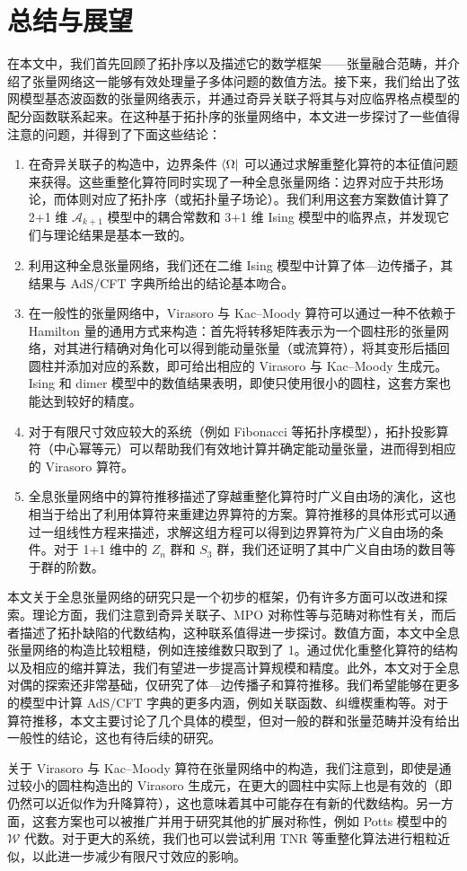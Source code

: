\chapter{总结与展望}
\label{chap:conclusion}

在本文中，我们首先回顾了拓扑序以及描述它的数学框架——张量融合范畴，并介绍了张量网络这一能够有效处理量子多体问题的数值方法。接下来，我们给出了弦网模型基态波函数的张量网络表示，并通过奇异关联子将其与对应临界格点模型的配分函数联系起来。在这种基于拓扑序的张量网络中，本文进一步探讨了一些值得注意的问题，并得到了下面这些结论：

\begin{enumerate}
  \item 在奇异关联子的构造中，边界条件 $\bra{\Omega}$ 可以通过求解重整化算符的本征值问题来获得。这些重整化算符同时实现了一种全息张量网络：边界对应于共形场论，而体则对应了拓扑序（或拓扑量子场论）。我们利用这套方案数值计算了 2+1 维 $\mathcal{A}_{k+1}$ 模型中的耦合常数和 3+1 维 Ising 模型中的临界点，并发现它们与理论结果是基本一致的。
  \item 利用这种全息张量网络，我们还在二维 Ising 模型中计算了体—边传播子，其结果与 AdS/CFT 字典所给出的结论基本吻合。
  \item 在一般性的张量网络中，Virasoro 与 Kac--Moody 算符可以通过一种不依赖于 Hamilton 量的通用方式来构造：首先将转移矩阵表示为一个圆柱形的张量网络，对其进行精确对角化可以得到能动量张量（或流算符），将其变形后插回圆柱并添加对应的系数，即可给出相应的 Virasoro 与 Kac--Moody 生成元。Ising 和 dimer 模型中的数值结果表明，即使只使用很小的圆柱，这套方案也能达到较好的精度。
  \item 对于有限尺寸效应较大的系统（例如 Fibonacci 等拓扑序模型），拓扑投影算符（中心幂等元）可以帮助我们有效地计算并确定能动量张量，进而得到相应的 Virasoro 算符。
  \item 全息张量网络中的算符推移描述了穿越重整化算符时广义自由场的演化，这也相当于给出了利用体算符来重建边界算符的方案。算符推移的具体形式可以通过一组线性方程来描述，求解这组方程可以得到边界算符为广义自由场的条件。对于 1+1 维中的 $Z_n$ 群和 $S_3$ 群，我们还证明了其中广义自由场的数目等于群的阶数。
\end{enumerate}

本文关于全息张量网络的研究只是一个初步的框架，仍有许多方面可以改进和探索。理论方面，我们注意到奇异关联子、MPO 对称性等与范畴对称性\cite{ji2020categorical,kong2020algebraic,wu2021categorical,lootens2023dualities}\allowbreak 有关，而后者描述了拓扑缺陷的代数结构，这种联系值得进一步探讨。数值方面，本文中全息张量网络的构造比较粗糙，例如连接维数只取到了 1。通过优化重整化算符的结构以及相应的缩并算法，我们有望进一步提高计算规模和精度。此外，本文对于全息对偶的探索还非常基础，仅研究了体—边传播子和算符推移。我们希望能够在更多的模型中计算 AdS/CFT 字典的更多内涵，例如关联函数、纠缠楔重构等。对于算符推移，本文主要讨论了几个具体的模型，但对一般的群和张量范畴并没有给出一般性的结论，这也有待后续的研究。

关于 Virasoro 与 Kac--Moody 算符在张量网络中的构造，我们注意到，即使是通过较小的圆柱构造出的 Virasoro 生成元，在更大的圆柱中实际上也是有效的（即仍然可以近似作为升降算符），这也意味着其中可能存在有新的代数结构。另一方面，这套方案也可以被推广并用于研究其他的扩展对称性，例如 Potts 模型中的 $\mathcal{W}$ 代数\cite{fateev1987conformal}。对于更大的系统，我们也可以尝试利用 TNR 等重整化算法进行粗粒近似，以此进一步减少有限尺寸效应的影响。
